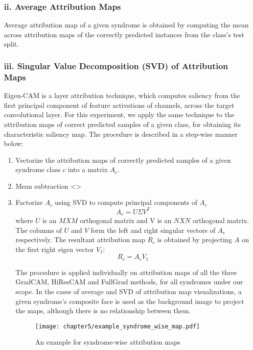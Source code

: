 \documentclass[../report.tex]{subfiles}
\begin{document}
    \subsubsection{ii. Average Attribution Maps}
    Average attribution map of a given syndrome is obtained by computing the mean across attribution maps of the correctly predicted instances from the class's test split.
    \subsubsection{iii. Singular Value Decomposition (SVD) of Attribution Maps}
	Eigen-CAM \cite{muhammad2020eigen} is a layer attribution technique, which computes saliency from the first principal component of feature activations of channels, across the target convolutional layer. For this experiment, we apply the same technique to the attribution maps of correct predicted samples of a given class, for obtaining its characteristic saliency map. The procedure is described in a step-wise manner below:

	\begin{enumerate}
		\item Vectorize the attribution maps of correctly predicted samples of a given syndrome class $c$ into a matrix $A_{c}$.
		\item Mean subtraction <>
		\item Factorize $A_{c}$ using SVD to compute principal components of $A_{c}$
		\begin{equation}
			A_{c} = U \Sigma {V}^T
		\end{equation}
		where $U$ is an $MXM$ orthogonal matrix and V is an $NXN$ orthogonal matrix.  The columns of $U$ and $V$ form the left and right singular vectors of $A_{c}$ respectively. The resultant attribution map $R_{c}$ is obtained by projecting $A$ on the first right eigen vector $V_{1}$:
		\begin{equation}
			R_{c} = A_{c}V_{1}
		\end{equation}
	
	The procedure is applied individually on attribution maps of all the three GradCAM, HiResCAM and FullGrad methods, for all syndromes under our scope. In the cases of average and SVD of attribution map visualizations, a given syndrome's composite face is used as the background image to project the maps, although there is no relationship between them.
	\begin{figure}[H]
		\hspace*{0cm}      
		\texttt{[image: chapter5/example\_syndrome\_wise\_map.pdf]}
		\caption{An example for syndrome-wise attribution maps}
		\label{fig_synd_maps}
	\end{figure}
	\end{enumerate}    
\end{document}
